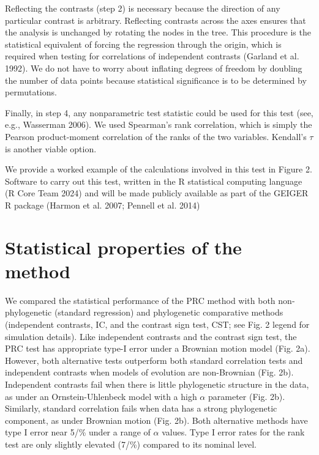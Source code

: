 \documentclass[fleqn,10pt,lineno]{wlpeerj} %
\begin{document}
Reflecting the contrasts (step 2) is necessary because the direction of any particular contrast is arbitrary. Reflecting contrasts across the axes ensures that the analysis is unchanged by rotating the nodes in the tree. This procedure is the statistical equivalent of forcing the regression through the origin, which is required when testing for correlations of independent contrasts (Garland et al. 1992). We do not have to worry about inflating degrees of freedom by doubling the number of data points because statistical significance is to be determined by permutations.

Finally, in step 4, any nonparametric test statistic could be used for this test (see, e.g., Wasserman 2006). We used Spearman's rank correlation, which is simply the Pearson product-moment correlation of the ranks of the two variables. Kendall's \(\tau\) is another viable option.

We provide a worked example of the calculations involved in this test in Figure 2. Software to carry out this test, written in the R statistical computing language (R Core Team 2024) and will be made publicly available as part of the GEIGER R package (Harmon et al. 2007; Pennell et al. 2014)

\section{Statistical properties of the method}\label{statistical-properties-of-the-method}

We compared the statistical performance of the PRC method with both non-phylogenetic (standard regression) and phylogenetic comparative methods (independent contrasts, IC, and the contrast sign test, CST; see Fig. 2 legend for simulation details). Like independent contrasts and the contrast sign test, the PRC test has appropriate type-I error under a Brownian motion model (Fig. 2a). However, both alternative tests outperform both standard correlation tests and independent contrasts when models of evolution are non-Brownian (Fig. 2b). Independent contrasts fail when there is little phylogenetic structure in the data, as under an Ornstein-Uhlenbeck model with a high \(\alpha\) parameter (Fig. 2b). Similarly, standard correlation fails when data has a strong phylogenetic component, as under Brownian motion (Fig. 2b). Both alternative methods have type I error near 5/\% under a range of \(\alpha\) values. Type I error rates for the rank test are only slightly elevated (7/\%) compared to its nominal level.
\end{document}
